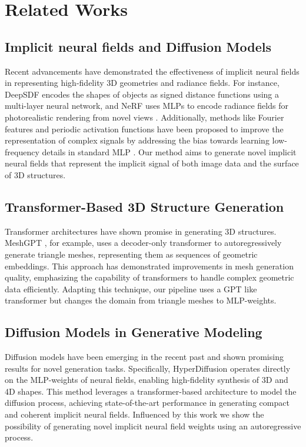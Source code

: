 \section{Related Works}
\label{sec:literature}

\subsection*{Implicit neural fields and Diffusion Models}
Recent advancements have demonstrated the effectiveness of implicit neural fields in representing high-fidelity 3D geometries and radiance fields. For instance, DeepSDF \cite{park2019deepsdflearningcontinuoussigned} encodes the shapes of objects as signed distance functions using a multi-layer neural network, and NeRF uses MLPs to encode radiance fields for photorealistic rendering from novel views \cite{mildenhall2020nerfrepresentingscenesneural}. Additionally, methods like Fourier features and periodic activation functions have been proposed to improve the representation of complex signals by addressing the bias towards learning low-frequency details in standard MLP \cite{tancik2020fourierfeaturesletnetworks, sitzmann2020implicitneuralrepresentationsperiodic}. Our method aims to generate novel implicit neural fields that represent the implicit signal of both image data and the surface of 3D structures.


\subsection*{Transformer-Based 3D Structure Generation}
Transformer architectures have shown promise in generating 3D structures. MeshGPT \cite{siddiqui2023meshgpt}, for example, uses a decoder-only transformer to autoregressively generate triangle meshes, representing them as sequences of geometric embeddings. This approach has demonstrated improvements in mesh generation quality, emphasizing the capability of transformers to handle complex geometric data efficiently. Adapting this technique, our pipeline uses a GPT like transformer but changes the domain from triangle meshes to MLP-weights.


\subsection*{Diffusion Models in Generative Modeling}
Diffusion models have been emerging in the recent past and shown promising results for novel generation tasks. Specifically, HyperDiffusion \cite{erkoç2023hyperdiffusion} operates directly on the MLP-weights of neural fields, enabling high-fidelity synthesis of 3D and 4D shapes. This method leverages a transformer-based architecture to model the diffusion process, achieving state-of-the-art performance in generating compact and coherent implicit neural fields. Influenced by this work we show the possibility of generating novel implicit neural field weights using an autoregressive process.
